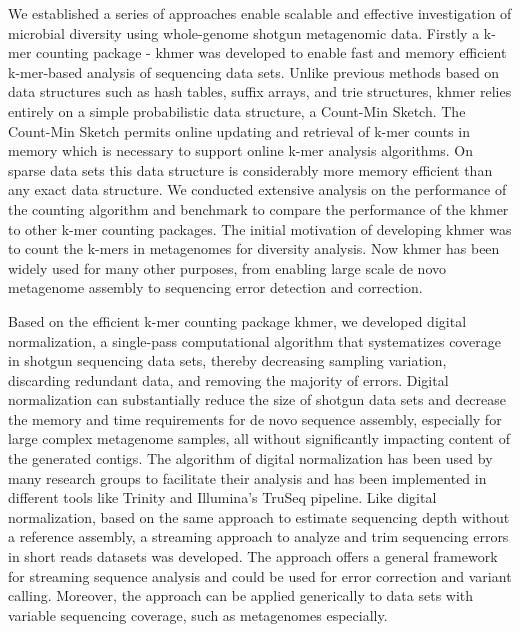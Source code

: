 We established a series of approaches enable scalable
and effective investigation of microbial diversity using whole-genome shotgun
metagenomic data.  Firstly a k-mer counting package - khmer was developed to
enable fast and memory efficient k-mer-based analysis of sequencing data sets.
Unlike previous methods based on data structures such as hash tables, suffix
arrays, and trie structures, khmer relies 
 entirely on a simple probabilistic data structure, a Count-Min Sketch. The
 Count-Min Sketch permits online updating and retrieval of k-mer counts in
 memory which is necessary to support online k-mer analysis algorithms. On
 sparse data sets this data structure is considerably more  memory efficient
 than any exact data structure.
  We conducted extensive  analysis on the performance of the counting algorithm
  and benchmark to compare the performance of the khmer to other k-mer counting
  packages. 
   The initial motivation of developing khmer was to count the  k-mers in
   metagenomes for diversity analysis. Now khmer has been widely used for many
   other purposes, from  
      enabling large scale de novo metagenome assembly  to sequencing error
      detection and correction.
        
         Based on the efficient k-mer counting package khmer, we developed
         digital normalization, a single-pass  computational algorithm that
         systematizes coverage in shotgun sequencing data sets, thereby
         decreasing sampling  variation, discarding redundant data, and
         removing the majority of errors. Digital normalization can
         substantially reduce the size of shotgun data sets and decrease the
         memory and time requirements for de novo sequence assembly, especially
         for large complex metagenome samples, all without significantly
             impacting content of the generated contigs.  The algorithm of
             digital normalization has been used by many research groups to
             facilitate their analysis and has been implemented in different
             tools like Trinity and  Illumina's TruSeq pipeline. Like digital
             normalization, based on the same approach to estimate sequencing
             depth without a reference assembly, a streaming approach to
             analyze and trim sequencing errors in short reads datasets was
             developed. The approach offers a general framework for streaming
             sequence analysis and could be used for error correction and
             variant calling. Moreover, the approach can be applied generically
             to data sets with variable sequencing coverage, such as
             metagenomes especially.

